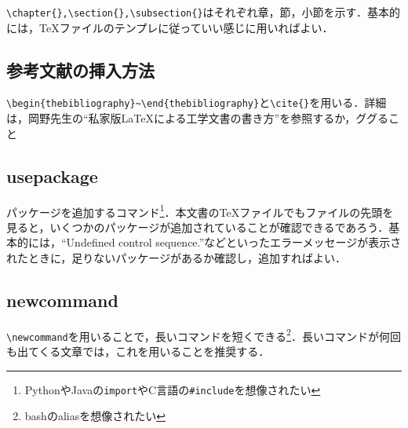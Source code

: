\documentclass[11pt,a4paper]{jsarticle}
\begin{document}
\verb|\chapter{},\section{},\subsection{}|はそれぞれ章，節，小節を示す．基本的には，\TeX ファイルのテンプレに従っていい感じに用いればよい．

\subsection{参考文献の挿入方法}

\verb|\begin{thebibliography}~\end{thebibliography}|と\verb|\cite{}|を用いる．詳細は，岡野先生の``私家版\LaTeX による工学文書の書き方''を参照するか，ググること

\subsection{usepackage}

パッケージを追加するコマンド\footnote{PythonやJavaの\verb|import|やC言語の\verb|#include|を想像されたい}．本文書の\TeX ファイルでもファイルの先頭を見ると，いくつかのパッケージが追加されていることが確認できるであろう．基本的には，``Undefined control sequence.''などといったエラーメッセージが表示されたときに，足りないパッケージがあるか確認し，追加すればよい．

\subsection{newcommand}

\verb|\newcommand|を用いることで，長いコマンドを短くできる\footnote{bashのaliasを想像されたい}．長いコマンドが何回も出てくる文章では，これを用いることを推奨する．
\end{document}
